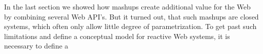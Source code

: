 













In the last section we showed how mashups create additional value for the Web by combining several Web API's.
But it turned out, that such mashups are closed systems, which often only allow little degree of parametrization.
To get past such limitations and define a conceptual model for reactive Web systems, it is necessary to define a 

